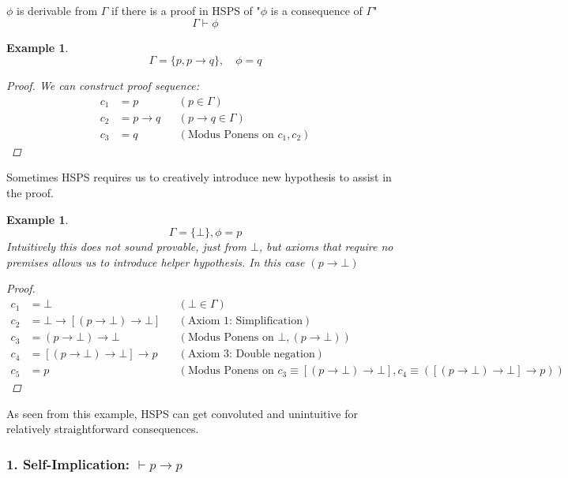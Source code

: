 \documentclass{article}
\newtheorem{example}[theorem]{Example}
\newtheorem{definition}[theorem]{Definition}
\let\olddefinition\definition
\let\endolddefinition\enddefinition
\renewenvironment{definition}
  {\begin{tcolorbox}[
      colback=red!10,
      colframe=red!50!black,
      boxrule=0.6pt,
      arc=2pt,
      left=6pt,right=6pt,top=4pt,bottom=4pt,
      breakable
    ]\olddefinition}
  {\endolddefinition\end{tcolorbox}}
\begin{document}
\begin{definition}[Derivable]
    $\phi$ is derivable from $\Gamma$ if there is a proof in HSPS of "$\phi$ is a consequence of $\Gamma$"
    \[\Gamma \vdash \phi\]
\end{definition}
\begin{example}
\[\Gamma = \{p, p\rightarrow q\}, \quad \phi = q\]
\begin{proof}
    We can construct proof sequence:
    \begin{align*}
        c_1 &= p                && (p \in \Gamma) \\
        c_2 &= p \to q          && (p \to q \in \Gamma) \\
        c_3 &= q                && (\text{Modus Ponens on } c_1, c_2)
    \end{align*}
\end{proof}
\end{example}
Sometimes HSPS requires us to creatively introduce new hypothesis to assist in the proof.
\begin{example}
    \[\Gamma = \{\bot\}, \phi = p\]
    Intuitively this does not sound provable, just from $\bot$, but axioms that require no premises allows us to introduce helper hypothesis. In this case
    $(p \rightarrow \bot)$
    \begin{proof}
        \begin{align*}
            c_1 &= \bot                && (\bot \in \Gamma) \\
            c_2 &= \bot \rightarrow [(p\rightarrow \bot) \rightarrow \bot]          && (\text{Axiom 1: Simplification}) \\
            c_3 &= (p\rightarrow \bot) \rightarrow \bot                && (\text{Modus Ponens on } \bot, (p \rightarrow \bot))\\
            c_4 &= [(p\rightarrow \bot) \rightarrow \bot] \rightarrow p && (\text{Axiom 3: Double negation})\\
            c_5 &= p && (\text{Modus Ponens on } c_3 \equiv [(p \rightarrow \bot) \rightarrow \bot], c_4 \equiv ([(p\rightarrow \bot) \rightarrow \bot] \rightarrow p))
        \end{align*} 
    \end{proof}
\end{example}
As seen from  this example, HSPS can get convoluted and unintuitive for relatively straightforward consequences. 
\subsubsection*{1. Self-Implication: $\vdash p \to p$}
\end{document}
